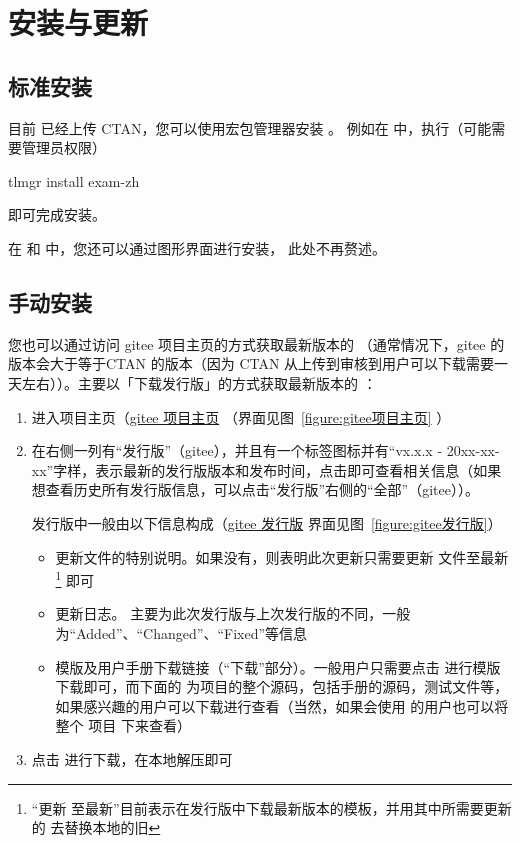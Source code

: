 
\section{安装与更新}


\subsection{标准安装}

目前  已经上传 CTAN，您可以使用宏包管理器安装 。
例如在 \TeXLive{} 中，执行（可能需要管理员权限）
\begin{shellcode}[morekeywords={tlmgr,install}]
  tlmgr install exam-zh
\end{shellcode}
即可完成安装。

在 \TeXLive{} 和 \MiKTeX{} 中，您还可以通过图形界面进行安装，
此处不再赘述。


\subsection{手动安装}

您也可以通过访问 gitee 项目主页的方式获取最新版本的 （通常情况下，gitee 的版本会大于等于CTAN 的版本（因为 CTAN 从上传到审核到用户可以下载需要一天左右））。主要以「下载发行版」的方式获取最新版本的 ：

\begin{enumerate}
  \item 进入项目主页（\href{https://gitee.com/xkwxdyy/exam-zh}{gitee 项目主页} （界面见图~\ref{figure:gitee项目主页} ）
  \item 在右侧一列有“发行版”（gitee），并且有一个标签图标并有“vx.x.x - 20xx-xx-xx”字样，表示最新的发行版版本和发布时间，点击即可查看相关信息（如果想查看历史所有发行版信息，可以点击“发行版”右侧的“全部”（gitee））。
  
    发行版中一般由以下信息构成（\href{https://gitee.com/xkwxdyy/exam-zh/releases}{gitee 发行版} 界面见图~\ref{figure:gitee发行版}）
      \begin{itemize}
        \item 更新文件的特别说明。如果没有，则表明此次更新只需要更新  文件至最新\footnote{“更新  至最新”目前表示在发行版中下载最新版本的模板，并用其中所需要更新的  去替换本地的旧 } 即可
        \item 更新日志。 主要为此次发行版与上次发行版的不同，一般为“Added”、“Changed”、“Fixed”等信息
        \item 模版及用户手册下载链接（“下载”部分）。一般用户只需要点击  进行模版下载即可，而下面的  为项目的整个源码，包括手册的源码，测试文件等，如果感兴趣的用户可以下载进行查看（当然，如果会使用  的用户也可以将整个  项目  下来查看）
      \end{itemize}
  \item 点击  进行下载，在本地解压即可
\end{enumerate}


